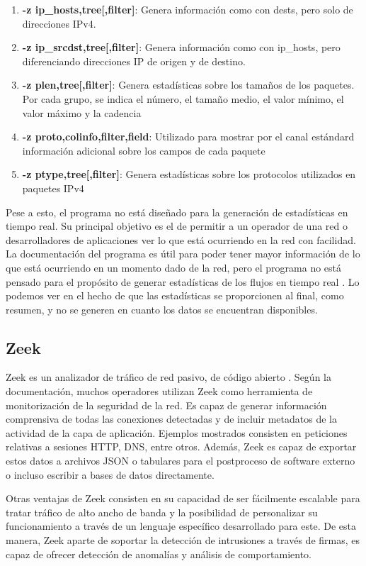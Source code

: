 \begin{enumerate}
    \item \textbf{-z ip\_hosts,tree[,filter]}: Genera información como con dests, pero solo de direcciones IPv4.
    \item \textbf{-z ip\_srcdst,tree[,filter]}: Genera información como con ip\_hosts, pero diferenciando direcciones IP de origen y de destino.
    \item \textbf{-z plen,tree[,filter]}: Genera estadísticas sobre los tamaños de los paquetes. Por cada grupo, se indica el número, el tamaño medio, el valor mínimo, el valor máximo y la cadencia
    \item \textbf{-z proto,colinfo,filter,field}: Utilizado para mostrar por el canal estándard información adicional sobre los campos de cada paquete
    \item \textbf{-z ptype,tree[,filter]}: Genera estadísticas sobre los protocolos utilizados en paquetes IPv4
\end{enumerate}

Pese a esto, el programa no está diseñado para la generación de estadísticas en tiempo real. Su principal objetivo es el de permitir a un operador de una red o desarrolladores de aplicaciones ver lo que está ocurriendo en la red con facilidad. La documentación del programa es útil para poder tener mayor información de lo que está ocurriendo en un momento dado de la red, pero el programa no está pensado para el propósito de generar estadísticas de los flujos en tiempo real \cite{wiresharkrealtimestats}. Lo podemos ver en el hecho de que las estadísticas se proporcionen al final, como resumen, y no se generen en cuanto los datos se encuentran disponibles.

\subsection{Zeek}

Zeek es un analizador de tráfico de red pasivo, de código abierto \cite{zeek_documentation}. Según la documentación, muchos operadores utilizan Zeek como herramienta de monitorización de la seguridad de la red. Es capaz de generar información comprensiva de todas las conexiones detectadas y de incluir metadatos de la actividad de la capa de aplicación. Ejemplos mostrados consisten en peticiones relativas a sesiones HTTP, DNS, entre otros. Además, Zeek es capaz de exportar estos datos a archivos JSON o tabulares para el postproceso de software externo o incluso escribir a bases de datos directamente. 

Otras ventajas de Zeek consisten en su capacidad de ser fácilmente escalable para tratar tráfico de alto ancho de banda y la posibilidad de personalizar su funcionamiento a través de un lenguaje específico desarrollado para este. De esta manera, Zeek aparte de soportar la detección de intrusiones a través de firmas, es capaz de ofrecer detección de anomalías y análisis de comportamiento.

